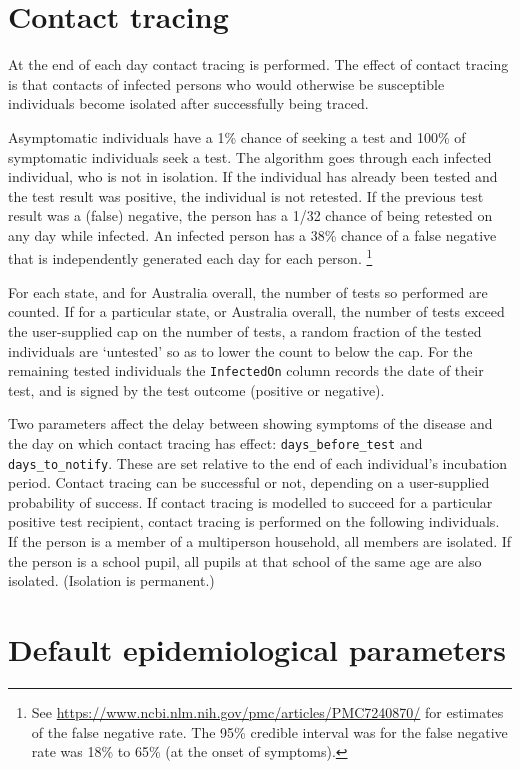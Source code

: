 \documentclass[submission]{grattan}
\newcommand*{\code}[1]{\texttt{#1}}
\begin{document}
\section{Contact tracing}
At the end of each day contact tracing is performed. 
The effect of contact tracing is that contacts of infected
persons who would otherwise be susceptible 
individuals become isolated after successfully being traced.

Asymptomatic individuals have a 1\% chance of seeking a test and 
100\% of symptomatic individuals seek a test. The algorithm goes
through each infected individual, who is not in isolation. If the individual has already 
been tested and the test result was positive, the individual is not
retested. If the previous test result was a (false) negative, the person
has a 1/32 chance of being retested on any day while infected. 
An infected person has a  38\% chance
of a false negative that is independently generated each day for each person.%
	\footnote{See \url{https://www.ncbi.nlm.nih.gov/pmc/articles/PMC7240870/} for 
	estimates of the false negative rate. The 95\% credible interval was for the false
	negative rate was 18\% to
	65\% (at the onset of symptoms).}

For each state, and for Australia overall, the number of tests so performed
are counted. If for a particular state, or Australia overall,
the number of tests exceed the user-supplied cap on the number
of tests, a random fraction of the tested individuals are `untested' 
so as to lower the count to below the cap. For the remaining tested individuals
the \code{InfectedOn} column records the date of their test, and is signed
by the test outcome (positive or negative).

Two parameters affect the delay between showing symptoms of the 
disease and the day on which contact tracing has effect: 
\code{days\_before\_test} and \code{days\_to\_notify}. These are set
relative to the end of each individual's incubation period. Contact 
tracing can be successful or not, depending on a user-supplied probability
of success. If contact tracing is modelled to succeed for a particular 
positive test recipient,
contact tracing is performed on the following individuals. 
If the person is a member of a multiperson
household, all members are isolated. If the person is a school pupil, all
pupils at that school of the same age are also isolated. (Isolation is permanent.)


\onecolumn
\section{Default epidemiological parameters}
\end{document}
